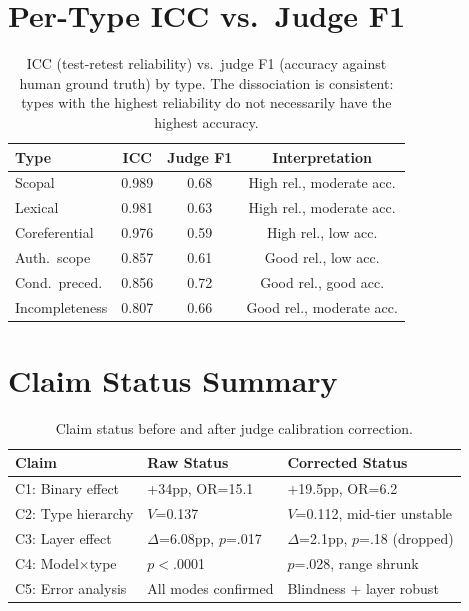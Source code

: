 \documentclass[11pt]{article}
\begin{document}
\section{Per-Type ICC vs.\ Judge F1}

\begin{table}[h]
\centering
\small
\begin{tabular}{lccc}
\toprule
\textbf{Type} & \textbf{ICC} & \textbf{Judge F1} & \textbf{Interpretation} \\
\midrule
Scopal & 0.989 & 0.68 & High rel., moderate acc. \\
Lexical & 0.981 & 0.63 & High rel., moderate acc. \\
Coreferential & 0.976 & 0.59 & High rel., low acc. \\
Auth.\ scope & 0.857 & 0.61 & Good rel., low acc. \\
Cond.\ preced. & 0.856 & 0.72 & Good rel., good acc. \\
Incompleteness & 0.807 & 0.66 & Good rel., moderate acc. \\
\bottomrule
\end{tabular}
\caption{ICC (test-retest reliability) vs.\ judge F1 (accuracy against human ground truth) by type. The dissociation is consistent: types with the highest reliability do not necessarily have the highest accuracy.}
\label{tab:icc_f1}
\end{table}

\section{Claim Status Summary}

\begin{table}[h]
\centering
\small
\begin{tabular}{lll}
\toprule
\textbf{Claim} & \textbf{Raw Status} & \textbf{Corrected Status} \\
\midrule
C1: Binary effect & +34pp, OR=15.1 & +19.5pp, OR=6.2 \\
C2: Type hierarchy & $V$=0.137 & $V$=0.112, mid-tier unstable \\
C3: Layer effect & $\Delta$=6.08pp, $p$=.017 & $\Delta$=2.1pp, $p$=.18 (dropped) \\
C4: Model$\times$type & $p$$<$.0001 & $p$=.028, range shrunk \\
C5: Error analysis & All modes confirmed & Blindness + layer robust \\
\bottomrule
\end{tabular}
\caption{Claim status before and after judge calibration correction.}
\label{tab:claim_status}
\end{table}
\end{document}
